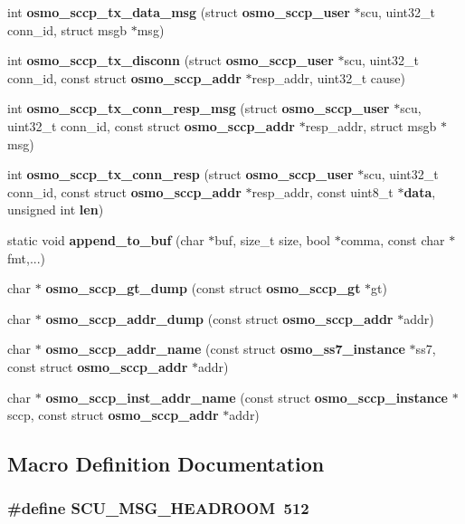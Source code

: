 \begin{DoxyCompactItemize}
\item 
int {\bf osmo\+\_\+sccp\+\_\+tx\+\_\+data\+\_\+msg} (struct {\bf osmo\+\_\+sccp\+\_\+user} $\ast$scu, uint32\+\_\+t conn\+\_\+id, struct msgb $\ast$msg)
\item 
int {\bf osmo\+\_\+sccp\+\_\+tx\+\_\+disconn} (struct {\bf osmo\+\_\+sccp\+\_\+user} $\ast$scu, uint32\+\_\+t conn\+\_\+id, const struct {\bf osmo\+\_\+sccp\+\_\+addr} $\ast$resp\+\_\+addr, uint32\+\_\+t cause)
\item 
int {\bf osmo\+\_\+sccp\+\_\+tx\+\_\+conn\+\_\+resp\+\_\+msg} (struct {\bf osmo\+\_\+sccp\+\_\+user} $\ast$scu, uint32\+\_\+t conn\+\_\+id, const struct {\bf osmo\+\_\+sccp\+\_\+addr} $\ast$resp\+\_\+addr, struct msgb $\ast$msg)
\item 
int {\bf osmo\+\_\+sccp\+\_\+tx\+\_\+conn\+\_\+resp} (struct {\bf osmo\+\_\+sccp\+\_\+user} $\ast$scu, uint32\+\_\+t conn\+\_\+id, const struct {\bf osmo\+\_\+sccp\+\_\+addr} $\ast$resp\+\_\+addr, const uint8\+\_\+t $\ast${\bf data}, unsigned int {\bf len})
\item 
static void {\bf append\+\_\+to\+\_\+buf} (char $\ast$buf, size\+\_\+t size, bool $\ast$comma, const char $\ast$fmt,...)
\item 
char $\ast$ {\bf osmo\+\_\+sccp\+\_\+gt\+\_\+dump} (const struct {\bf osmo\+\_\+sccp\+\_\+gt} $\ast$gt)
\item 
char $\ast$ {\bf osmo\+\_\+sccp\+\_\+addr\+\_\+dump} (const struct {\bf osmo\+\_\+sccp\+\_\+addr} $\ast$addr)
\item 
char $\ast$ {\bf osmo\+\_\+sccp\+\_\+addr\+\_\+name} (const struct {\bf osmo\+\_\+ss7\+\_\+instance} $\ast$ss7, const struct {\bf osmo\+\_\+sccp\+\_\+addr} $\ast$addr)
\item 
char $\ast$ {\bf osmo\+\_\+sccp\+\_\+inst\+\_\+addr\+\_\+name} (const struct {\bf osmo\+\_\+sccp\+\_\+instance} $\ast$sccp, const struct {\bf osmo\+\_\+sccp\+\_\+addr} $\ast$addr)
\end{DoxyCompactItemize}


\subsection{Macro Definition Documentation}
\subsubsection[{S\+C\+U\+\_\+\+M\+S\+G\+\_\+\+H\+E\+A\+D\+R\+O\+OM}]{\setlength{\rightskip}{0pt plus 5cm}\#define S\+C\+U\+\_\+\+M\+S\+G\+\_\+\+H\+E\+A\+D\+R\+O\+OM~512}\label{sccp__helpers_8c_a75446d92130ee5919a8b84aaeaafca9d}


